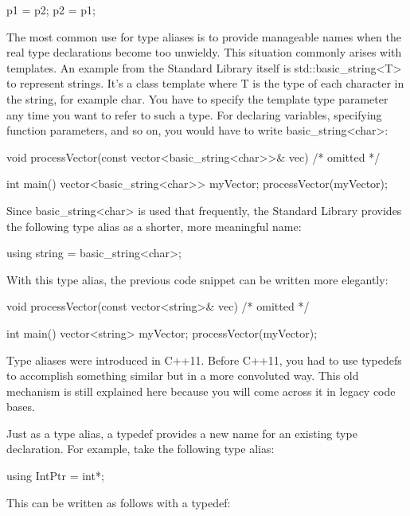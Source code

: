 \begin{cpp}
p1 = p2;
p2 = p1;
\end{cpp}

The most common use for type aliases is to provide manageable names when the real type declarations become too unwieldy. This situation commonly arises with templates. An example from the Standard Library itself is std::basic\_string<T> to represent strings. It’s a class template where T is the type of each character in the string, for example char. You have to specify the template type parameter any time you want to refer to such a type. For declaring variables, specifying function parameters, and so on, you would have to write basic\_string<char>:

\begin{cpp}
void processVector(const vector<basic_string<char>>& vec) { /* omitted */ }

int main()
{
    vector<basic_string<char>> myVector;
    processVector(myVector);
}
\end{cpp}

Since basic\_string<char> is used that frequently, the Standard Library provides the following type alias as a shorter, more meaningful name:

\begin{cpp}
using string = basic_string<char>;
\end{cpp}

With this type alias, the previous code snippet can be written more elegantly:

\begin{cpp}
void processVector(const vector<string>& vec) { /* omitted */ }

int main()
{
    vector<string> myVector;
    processVector(myVector);
}
\end{cpp}


Type aliases were introduced in C++11. Before C++11, you had to use typedefs to accomplish something similar but in a more convoluted way. This old mechanism is still explained here because you will come across it in legacy code bases.

Just as a type alias, a typedef provides a new name for an existing type declaration. For example, take the following type alias:

\begin{cpp}
using IntPtr = int*;
\end{cpp}

This can be written as follows with a typedef:

